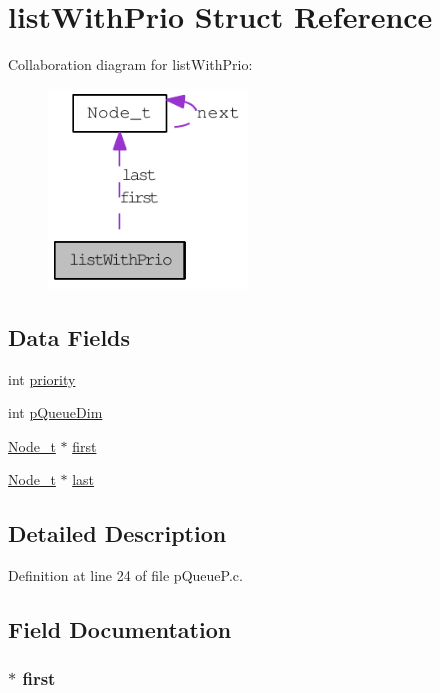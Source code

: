 \hypertarget{structlist_with_prio}{
\section{listWithPrio Struct Reference}
\label{structlist_with_prio}
}


Collaboration diagram for listWithPrio:\nopagebreak
\begin{figure}[H]
\begin{center}
\leavevmode
\includegraphics[width=150pt]{structlist_with_prio__coll__graph}
\end{center}
\end{figure}
\subsection*{Data Fields}
\begin{DoxyCompactItemize}
\item 
int \hyperlink{structlist_with_prio_acec9ce2df15222151ad66fcb1d74eb9f}{priority}
\item 
int \hyperlink{structlist_with_prio_a671979afa869339d57da6ad30c0498d8}{pQueueDim}
\item 
\hyperlink{struct_node__t}{Node\_\-t} $\ast$ \hyperlink{structlist_with_prio_aaea2707399dfe92afae4ef90749f7542}{first}
\item 
\hyperlink{struct_node__t}{Node\_\-t} $\ast$ \hyperlink{structlist_with_prio_a1b88fdeb724166cbdf6717d7ba4b49c6}{last}
\end{DoxyCompactItemize}


\subsection{Detailed Description}


Definition at line 24 of file pQueueP.c.



\subsection{Field Documentation}
\hypertarget{structlist_with_prio_aaea2707399dfe92afae4ef90749f7542}{
\subsubsection[{first}]{$\ast$ {\bf first}}}
\label{structlist_with_prio_aaea2707399dfe92afae4ef90749f7542}


